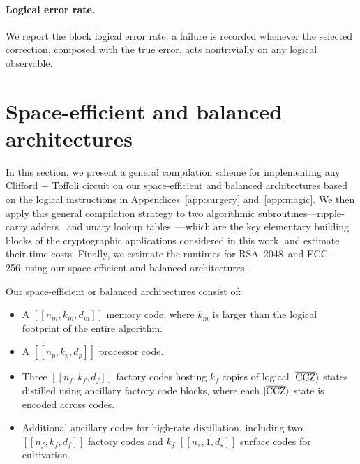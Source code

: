 \documentclass[reprint,twocolumn,secnumarabic,amssymb, aps, prx]{revtex4-2}
\newcommand{\ecc}{\mbox{ECC--256}}
\newcommand{\rsa}{\mbox{RSA--2048}}
\newcommand{\nproc}{n_p}
\newcommand{\kproc}{k_p}
\newcommand{\dproc}{d_p}
\newcommand{\nm}{n_m}
\newcommand{\km}{k_m}
\newcommand{\dm}{d_m}
\newcommand{\nf}{n_f}
\newcommand{\kf}{k_f}
\newcommand{\df}{d_f}
\newcommand{\ns}{n_s}
\newcommand{\ds}{d_s}
\newcommand{\ccz}{\ket{\overline{\text{CCZ}}}}
\begin{document}
\paragraph{Logical error rate.}
We report the block logical error rate: a failure is recorded whenever the selected correction, composed with the true error, acts nontrivially on any logical observable.

\section{Space-efficient and balanced architectures \label{app:compilation}} 
In this section, we present a general compilation scheme for implementing any Clifford + Toffoli circuit on our space-efficient and balanced architectures based on the logical instructions in Appendices~\ref{app:surgery} and~\ref{app:magic}. We then apply this general compilation strategy to two algorithmic subroutines---ripple-carry adders~\cite{vedral1996quantum, cuccaro2004new, gidney2018halving} and unary lookup tables~\cite{babbush2018encoding}---which are the key elementary building blocks of the cryptographic applications considered in this work, and estimate their time costs. Finally, we estimate the runtimes for \rsa\ and \ecc\ using our space-efficient and balanced architectures.

Our space-efficient or balanced architectures consist of:
\begin{itemize}
    \item A $[[\nm, \km, \dm]]$ memory code, where $\km$ is larger than the logical footprint of the entire algorithm.
    \item A $[[\nproc, \kproc, \dproc]]$ processor code.
    \item Three $[[\nf, \kf, \df]]$ factory codes hosting $\kf$ copies of logical $\ccz$ states distilled using ancillary factory code blocks, where each $\ccz$ state is encoded across codes.
    \item Additional ancillary codes for high-rate distillation, including two $[[\nf, \kf, \df]]$ factory codes and $\kf$ $[[\ns, 1, \ds]]$ surface codes for cultivation.
\end{itemize}
\end{document}
